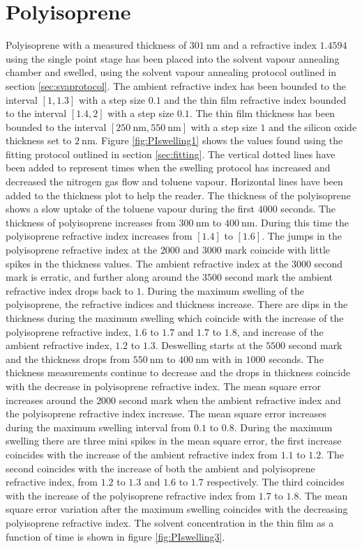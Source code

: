 \documentclass[MasterThesisMain.tex]{subfiles}
\begin{document}
\section{Polyisoprene}
Polyisoprene with a measured thickness of $\SI{301}{\nano\meter}$ and a refractive index $1.4594$ using the single point stage has been placed into the solvent vapour annealing chamber and swelled, using the solvent vapour annealing protocol outlined in section \ref{sec:svaprotocol}. The ambient refractive index has been bounded to the interval $[1,1.3]$ with a step size $0.1$ and the thin film refractive index bounded to the interval $[1.4,2]$ with a step size $0.1$. The thin film thickness has been bounded to the interval $[\SI{250}{\nano\meter},\SI{550}{\nano\meter}]$ with a step size $1$ and the silicon oxide thickness set to $\SI{2}{\nano\meter}$. Figure \ref{fig:PIswelling1} shows the values found using the fitting protocol outlined in section \ref{sec:fitting}. The vertical dotted lines have been added to represent times when the swelling protocol has increased and decreased the nitrogen gas flow and toluene vapour. Horizontal lines have been added to the thickness plot to help the reader. The thickness of the polyisoprene shows a slow uptake of the toluene vapour during the first $4000$ seconds. The thickness of polyisoprene increases from $\SI{300}{\nano\meter}$ to $\SI{400}{\nano\meter}$. During this time the polyisoprene refractive index increases from $[1.4]$ to $[1.6]$. The jumps in the polyisoprene refractive index at the $2000$ and $3000$ mark coincide with little spikes in the thickness values. The ambient refractive index at the $3000$ second mark is erratic, and further along around the $3500$ second mark the ambient refractive index drops back to $1$. During the maximum swelling of the polyisoprene, the refractive indices and thickness increase. There are dips in the thickness during the maximum swelling which coincide with the increase of the polyisoprene refractive index, $1.6$ to $1.7$ and $1.7$ to $1.8$, and increase of the ambient refractive index, $1.2$ to $1.3$. Deswelling starts at the $5500$ second mark and the thickness drops from $\SI{550}{\nano\meter}$ to $\SI{400}{\nano\meter}$ with in $1000$ seconds. The thickness measurements continue to decrease and the drops in thickness coincide with the decrease in polyisoprene refractive index. The mean square error increases around the $2000$ second mark when the ambient refractive index and the polyisoprene refractive index increase. The mean square error increases during the maximum swelling interval from $0.1$ to $0.8$. During the maximum swelling there are three mini spikes in the mean square error, the first increase coincides with the increase of the ambient refractive index from $1.1$ to $1.2$. The second coincides with the increase of both the ambient and polyisoprene refractive index, from $1.2$ to $1.3$ and $1.6$ to $1.7$ respectively. The third coincides with the increase of the polyisoprene refractive index from $1.7$ to $1.8$. The mean square error variation after the maximum swelling coincides with the decreasing polyisoprene refractive index. The solvent concentration in the thin film as a function of time is shown in figure \ref{fig:PIswelling3}.
\end{document}
